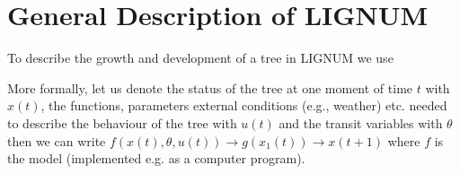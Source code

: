 \chapter{General Description of LIGNUM}

To describe the growth and development of a tree in LIGNUM we use 

More formally, let us denote the status of the tree at
one moment of time $ t $ with $ x(t)$, the functions, parameters
external conditions (e.g., weather) etc. needed to describe the
behaviour  of the tree with $ u(t) $ and
the transit variables with $ \theta $ then we can write $
f(x(t),\theta, u(t)) \rightarrow g(x_{1}(t)) \rightarrow x(t+1) $
where $ f $ is the model (implemented e.g. as a computer program). 

